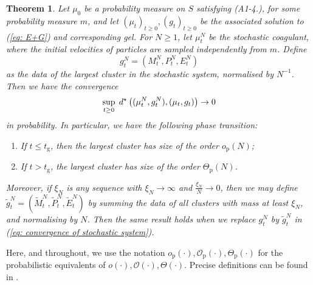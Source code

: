 \documentclass[11pt, notitlepage]{article}
\newtheorem{thm}{Theorem}[section]
\begin{document}
\begin{thm} \label{thrm: convergence of stochastic coagulent} Let $\mu_0$ be a probability measure on $S$ satisfying ({A1-4}.), for some probability measure $m$, and let $(\mu_t)_{t\ge 0}, (g_t)_{t\ge 0}$ be the associated solution to (\ref{eq: E+G}) and corresponding gel. For $N\ge 1$, let $\mu^N_t$ be the stochastic coagulant, where the initial velocities of particles are sampled independently from $m$. Define \begin{equation} g^N_t=(M^N_t, P^N_t, E^N_t)\end{equation}  as the data of the largest cluster in the stochastic system, normalised by $N^{-1}$. Then we have the convergence \begin{equation} \label{eq: convergence of stochastic system}
    \sup_{t\ge 0}\hspace{0.1cm}d^\star\left((\mu^N_t, g^N_t),(\mu_t, g_t)\right) \rightarrow 0
\end{equation} in probability. In particular, we have the following phase transition: \begin{enumerate}[label=\roman{*}).]
    \item If $t\le t_\mathrm{g}$, then the largest cluster has size of the order $o_\mathrm{p}(N)$;
    \item If $t>t_\mathrm{g}$, the largest cluster has size of the order $\Theta_\mathrm{p}(N)$.
\end{enumerate} 

Moreover, if $\xi_N$ is any sequence with $\xi_N\rightarrow \infty$ and $\frac{\xi_N}{N}\rightarrow 0$, then we may define $\widetilde{g}^N_t=(\widetilde{M}^N_t, \widetilde{P}^N_t, \widetilde{E}^N_t)$ by summing the data of all clusters with mass at least $\xi_N$, and normalising by $N$. Then the same result holds when we replace $g^N_t$ by $\widetilde{g}^N_t$ in (\ref{eq: convergence of stochastic system}).
\end{thm} 

Here, and throughout, we use the notation $o_\mathrm{p}(\cdot), \mathcal{O}_\mathrm{p}(\cdot), \Theta_\mathrm{p}(\cdot)$ for the probabilistic equivalents of $o(\cdot), \mathcal{O}(\cdot), \Theta(\cdot)$. Precise definitions can be found in \cite{JLR}.
\end{document}
